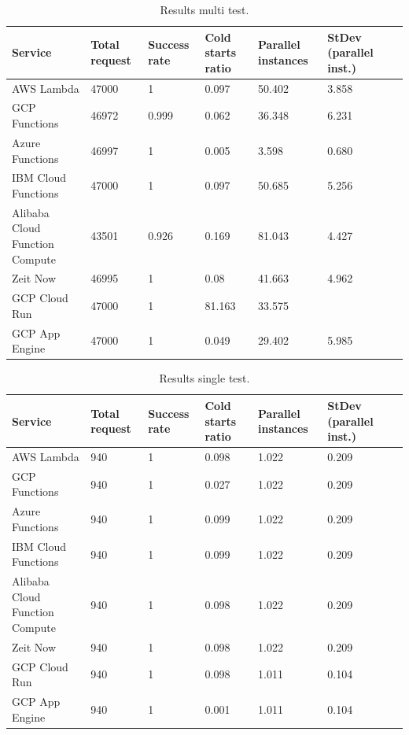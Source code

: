 \documentclass[11pt]{article}
\begin{document}
\begin{table}
\centering
 \begin{tabularx}{1\textwidth}{p{4cm} X X X X X X}
 \textbf{Service} & \textbf{Total request} & \textbf{Success rate} & \textbf{Cold starts ratio} & \textbf{Parallel instances} & \textbf{StDev (parallel inst.)} \\
 \hline
 \hline
 AWS Lambda & 47000 & 1 & 0.097 & 50.402 & 3.858\\
 \hline
 GCP Functions & 46972 & 0.999 & 0.062 & 36.348 & 6.231\\
 \hline
 Azure Functions & 46997 & 1 & 0.005 & 3.598 & 0.680\\
 \hline
 IBM Cloud Functions & 47000 & 1 & 0.097 & 50.685 & 5.256\\
 \hline
 Alibaba Cloud Function Compute & 43501 & 0.926 & 0.169 & 81.043 & 4.427\\
 \hline
 Zeit Now & 46995  & 1 & 0.08 & 41.663 & 4.962\\
 \hline
 GCP Cloud Run & 47000 & 1 & 81.163 & 33.575\\
 \hline
 GCP App Engine & 47000 & 1 & 0.049 & 29.402 & 5.985\\
 \hline
\end{tabularx}
\caption{Results multi test.}
\label{Tab:multi}
\end{table}


\begin{table}
\centering
 \begin{tabularx}{1\textwidth}{p{4cm} X X X X X X}
 \textbf{Service} & \textbf{Total request} & \textbf{Success rate} & \textbf{Cold starts ratio} & \textbf{Parallel instances} & \textbf{StDev (parallel inst.)} \\
 \hline
 \hline
 AWS Lambda & 940 & 1 & 0.098 & 1.022 & 0.209\\
 \hline
 GCP Functions & 940 & 1 & 0.027 & 1.022 & 0.209\\
 \hline
 Azure Functions & 940 & 1 & 0.099 & 1.022 & 0.209\\
 \hline
 IBM Cloud Functions & 940 & 1 & 0.099 & 1.022 & 0.209\\
 \hline
 Alibaba Cloud Function Compute & 940 & 1 & 0.098 & 1.022 & 0.209\\
 \hline
 Zeit Now & 940 & 1 & 0.098 & 1.022 & 0.209\\
 \hline
 GCP Cloud Run & 940 & 1 & 0.098 & 1.011 & 0.104\\
 \hline
 GCP App Engine & 940 & 1 & 0.001 & 1.011 & 0.104\\
 \hline

\end{tabularx}
\caption{Results single test.}
\label{Tab:single}
\end{table}
\end{document}
